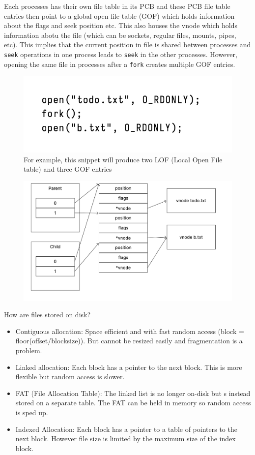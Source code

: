 \documentclass[../notes.tex]{subfiles}
\begin{document}
Each processes has their own file table in its PCB and these PCB file table entries then point to a global open file table (GOF) which holds information about the flags and seek position etc. This also houses the vnode which holds information abotu the file (which can be sockets, regular files, mounts, pipes, etc).
This implies that the current position in file is shared between processes and \texttt{seek} operations in one process leads to \texttt{seek} in the other processes. However, opening the same file in processes after a \texttt{fork} creates multiple GOF entries.

\begin{figure}[H]
    \centering
    \includegraphics[width=0.8\linewidth]{img/image_2023-03-15-18-30-11.png}
    \caption{For example, this snippet will produce two LOF (Local Open File table) and three GOF entries}
\end{figure}


\begin{figure}[H]
    \centering
    \includegraphics[width=0.8\linewidth]{img/image_2023-03-15-18-31-01.png}
\end{figure}


How are files stored on disk?

\begin{itemize}
    \item Contiguous allocation: Space efficient and with fast random access (block = floor(offset/blocksize)). But cannot be resized easily and fragmentation is a problem.
    \item Linked allocation: Each block has a pointer to the next block. This is more flexible but random access is slower.
    \item FAT (File Allocation Table): The linked list is no longer on-disk but s instead stored on a separate table. The FAT can be held in memory so random access is sped up.
    \item Indexed Allocation: Each block has a pointer to a table of pointers to the next block. However file size is limited by the maximum size of the index block.
\end{itemize}
\end{document}
